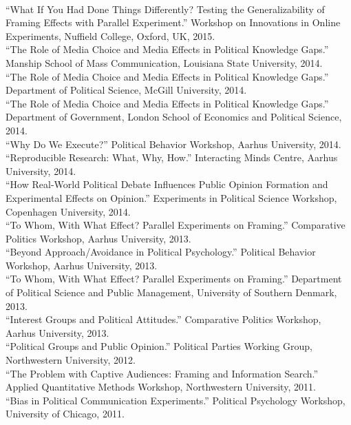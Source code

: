 \documentclass[12pt]{article}
\newcommand{\topic}[1]{\pagebreak[3]\indent {\color{lg}{\footnotesize #1 }}\\}
\newcommand{\entry}[1]{\indent {\color{lg}\guillemotright}\hspace{2pt}#1\vspace{.25em}\\}
\begin{document}
\topic{Invited Presentations}
\entry{``What If You Had Done Things Differently? Testing the Generalizability of Framing Effects with Parallel Experiment.'' Workshop on Innovations in Online Experiments, Nuffield College, Oxford, UK, 2015.}
\entry{``The Role of Media Choice and Media Effects in Political Knowledge Gaps.'' Manship School of Mass Communication, Louisiana State University, 2014.}
\entry{``The Role of Media Choice and Media Effects in Political Knowledge Gaps.'' Department of Political Science, McGill University, 2014.}
\entry{``The Role of Media Choice and Media Effects in Political Knowledge Gaps.'' Department of Government, London School of Economics and Political Science, 2014.}
\entry{``Why Do We Execute?'' Political Behavior Workshop, Aarhus University, 2014.}
\entry{``Reproducible Research: What, Why, How.'' Interacting Minds Centre, Aarhus University, 2014.}
\entry{``How Real-World Political Debate Influences Public Opinion Formation and Experimental Effects on Opinion.'' Experiments in Political Science Workshop, Copenhagen University, 2014.}
\entry{``To Whom, With What Effect? Parallel Experiments on Framing.'' Comparative Politics Workshop, Aarhus University, 2013.}
\entry{``Beyond Approach/Avoidance in Political Psychology.'' Political Behavior Workshop, Aarhus University, 2013.}
\entry{``To Whom, With What Effect? Parallel Experiments on Framing.'' Department of Political Science and Public Management, University of Southern Denmark, 2013.}
\entry{``Interest Groups and Political Attitudes.'' Comparative Politics Workshop, Aarhus University, 2013.}
\entry{``Political Groups and Public Opinion.'' Political Parties Working Group, Northwestern University, 2012.}
\entry{``The Problem with Captive Audiences: Framing and Information Search.'' Applied Quantitative Methods Workshop, Northwestern University, 2011.}
\entry{``Bias in Political Communication Experiments.'' Political Psychology Workshop, University of Chicago, 2011.}
\end{document}
